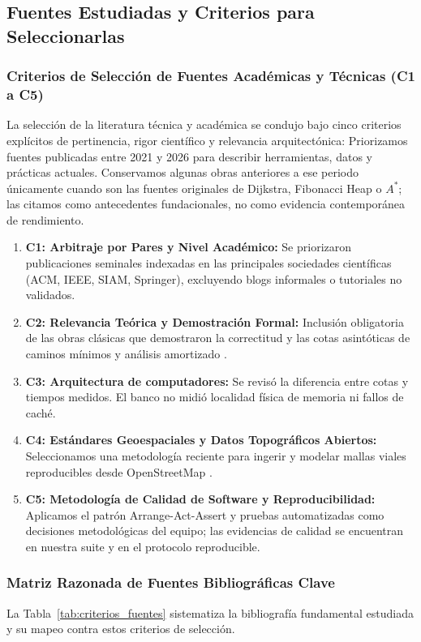 \subsection{Fuentes Estudiadas y Criterios para Seleccionarlas}
\label{sec:fuentes_criterios}

\subsubsection{Criterios de Selección de Fuentes Académicas y Técnicas (C1 a C5)}
La selección de la literatura técnica y académica se condujo bajo cinco criterios explícitos de pertinencia, rigor científico y relevancia arquitectónica:
Priorizamos fuentes publicadas entre 2021 y 2026 para describir herramientas, datos y prácticas actuales. Conservamos algunas obras anteriores a ese periodo únicamente cuando son las fuentes originales de Dijkstra, Fibonacci Heap o $A^*$; las citamos como antecedentes fundacionales, no como evidencia contemporánea de rendimiento.
\begin{enumerate}
    \item \textbf{C1: Arbitraje por Pares y Nivel Académico:} Se priorizaron publicaciones seminales indexadas en las principales sociedades científicas (ACM, IEEE, SIAM, Springer), excluyendo blogs informales o tutoriales no validados.
    \item \textbf{C2: Relevancia Teórica y Demostración Formal:} Inclusión obligatoria de las obras clásicas que demostraron la correctitud y las cotas asintóticas de caminos mínimos y análisis amortizado \parencite{dijkstra1959note,fredman1987fibonacci,tarjan1983data,cormen2022introduction}.
    \item \textbf{C3: Arquitectura de computadores:} Se revisó la diferencia entre cotas y tiempos medidos. El banco no midió localidad física de memoria ni fallos de caché.
    \item \textbf{C4: Estándares Geoespaciales y Datos Topográficos Abiertos:} Seleccionamos una metodología reciente para ingerir y modelar mallas viales reproducibles desde OpenStreetMap \parencite{boeing2025osmnx,openstreetmap2026}.
    \item \textbf{C5: Metodología de Calidad de Software y Reproducibilidad:} Aplicamos el patrón Arrange-Act-Assert y pruebas automatizadas como decisiones metodológicas del equipo; las evidencias de calidad se encuentran en nuestra suite y en el protocolo reproducible.
\end{enumerate}

\subsubsection{Matriz Razonada de Fuentes Bibliográficas Clave}
La Tabla~\ref{tab:criterios_fuentes} sistematiza la bibliografía fundamental estudiada y su mapeo contra estos criterios de selección.

